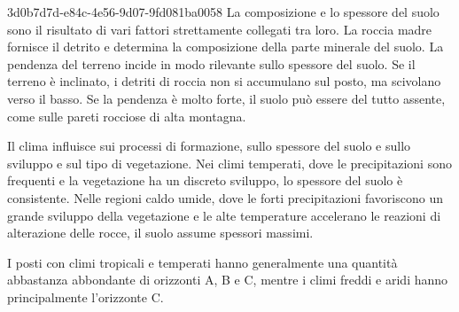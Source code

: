 \documentclass[preview]{standalone}
\begin{document}
\begin{snippet}{3d0b7d7d-e84c-4e56-9d07-9fd081ba0058}
    La composizione e lo spessore del suolo sono il risultato di vari fattori strettamente
    collegati tra loro.
    La roccia madre fornisce il detrito e determina la composizione della parte minerale del suolo.
    La pendenza del terreno incide in modo rilevante sullo spessore del suolo.
    Se il terreno è inclinato, i detriti di roccia non si accumulano sul posto, ma scivolano
    verso il basso.
    Se la pendenza è molto forte, il suolo può essere del tutto assente, come
    sulle pareti rocciose di alta montagna.

    Il clima influisce sui processi di formazione, sullo spessore del suolo e sullo sviluppo e sul tipo di vegetazione.
    Nei climi temperati, dove le precipitazioni sono frequenti e la vegetazione ha un discreto sviluppo,
    lo spessore del suolo è consistente.
    Nelle regioni caldo umide, dove le forti precipitazioni favoriscono un grande sviluppo della vegetazione
    e le alte temperature accelerano le reazioni di alterazione delle rocce, il suolo assume spessori massimi.

    I posti con climi tropicali e temperati hanno generalmente una quantità
    abbastanza abbondante di orizzonti A, B e C, mentre i climi freddi e aridi hanno principalmente
    l'orizzonte C.
\end{snippet}

\end{document}
